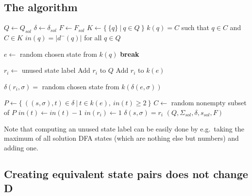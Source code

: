 \subsection{The algorithm}

\vspace{0.2cm}
\begin{spacing}{1}
\begin{algorithmic}[1]
    \State $Q \gets Q_{sol}$
    \State $\delta \gets \delta_{sol}$
    \State $F \gets F_{sol}$
	\State $K \gets \{\ \{q\}\ |\ q \in Q\ \}$ 
	\State $k(q) = C$ such that $q \in C$ and $C \in K$ 
	\State $in(q) = |d^-(q)|$ for all $q \in Q$ 
	
		 
				\State $e \gets$ random chosen state from $k(q)$
				\State \textbf{break}
			\EndIf
		\EndFor
		
		\State $r_i \gets$ unused state label 
        \State Add $r_i$ to $Q$
		\State Add $r_i$ to $k(e)$
		
		 
			\State $\delta(r_i, \sigma) =$ random chosen state from $k(\delta(e, \sigma))$
		\EndFor
		
		\State $P \gets \{\ ((s, \sigma), t) \in \delta\ |\ t \in k(e),\ in(t) \geq 2\ \}$ 
		\State $C \gets$ random nonempty subset of $P$
			\State $in(t) \gets in(t) - 1$
			\State $in(r_i) \gets 1$
            \State $\delta(s, \sigma) = r_i$
		\EndFor
	\EndFor
    \State \Return $(Q, \Sigma_{sol}, \delta, s_{sol}, F)$
	\EndFunction
\end{algorithmic}
\end{spacing}
\vspace{0.2cm}
\noindent Note that computing an unused state label can be easily done by e.g.\ taking the maximum of all solution DFA states (which are nothing else but numbers) and adding one.

\subsection{Creating equivalent state pairs does not change D} \label{ch:3:sec-D-proof}

